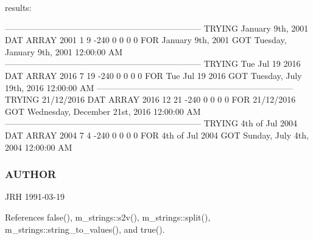 \begin{DoxyVerb}
\begin{DoxyVerb}
results:

 ---------------------------------------------------------------------
 TRYING January 9th, 2001
 DAT ARRAY         2001  1  9   -240    0   0   0    0
 FOR January 9th, 2001    GOT Tuesday, January 9th, 2001 12:00:00 AM
 ---------------------------------------------------------------------
 TRYING  Tue Jul 19 2016
 DAT ARRAY         2016  7  19  -240    0   0   0    0
 FOR  Tue Jul 19 2016     GOT Tuesday, July 19th, 2016 12:00:00 AM
 ---------------------------------------------------------------------
 TRYING  21/12/2016
 DAT ARRAY         2016  12 21  -240    0   0   0    0
 FOR  21/12/2016          GOT Wednesday, December 21st, 2016 12:00:00 AM
 ---------------------------------------------------------------------
 TRYING  4th of Jul 2004
 DAT ARRAY         2004  7  4   -240    0   0   0    0
 FOR  4th of Jul 2004     GOT Sunday, July 4th, 2004 12:00:00 AM
\end{DoxyVerb}


\subsubsection*{A\+U\+T\+H\+OR}

J\+RH 1991-\/03-\/19 

References false(), m\+\_\+strings\+::s2v(), m\+\_\+strings\+::split(), m\+\_\+strings\+::string\+\_\+to\+\_\+values(), and true().


\end{DoxyVerb}
